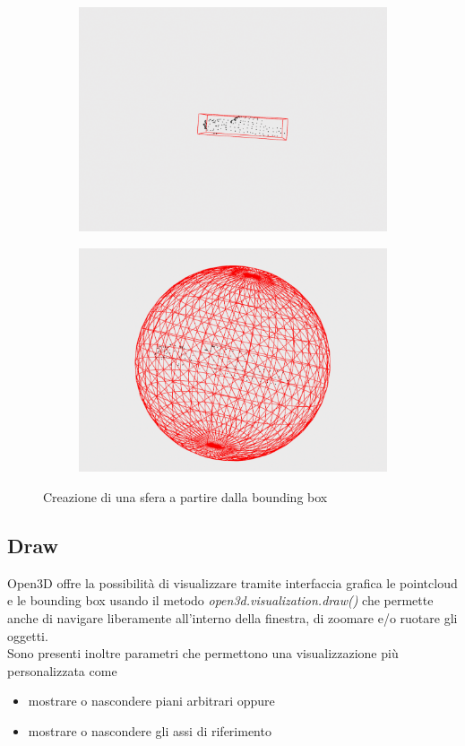 \documentclass[italian]{report}
\begin{document}
\begin{figure}[H]
	\centering
	\begin{subfigure}{0.45\textwidth}
		\includegraphics[width=\textwidth]{notExpandedBox}
	\end{subfigure}
	\begin{subfigure}{0.45\textwidth}
		\includegraphics[width=\textwidth]{Sphere}
	\end{subfigure}
	\footnotesize
	\caption{Creazione di una sfera a partire dalla bounding box}
\end{figure}
\subsection{Draw}
Open3D offre la possibilità di visualizzare tramite interfaccia grafica le pointcloud e le bounding box usando il metodo \textit{open3d.visualization.draw()} che permette anche di navigare liberamente all'interno della finestra, di zoomare e/o ruotare gli oggetti.\\
Sono presenti inoltre parametri che permettono una visualizzazione più personalizzata come
\begin{itemize}
	\item mostrare o nascondere piani arbitrari oppure
	\item mostrare o nascondere gli assi di riferimento
\end{itemize}
\end{document}
